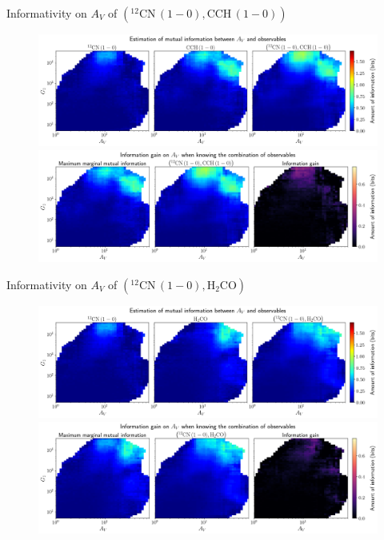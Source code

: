 \documentclass{beamer}
\begin{document}
\begin{frame}{Informativity on $A_V$ of $\left(\mathrm{^{12}CN\,(1-0)},\mathrm{CCH\,(1-0)}\right)$}
    \begin{figure}
        \centering
        \includegraphics[width=0.95\linewidth]{../mi/av__12cn10_cch10_mi.png}
        \vfill
        \includegraphics[width=0.95\linewidth]{../mi/av__12cn10_cch10_mi_gain.png}
    \end{figure}
\end{frame}

\begin{frame}{Informativity on $A_V$ of $\left(\mathrm{^{12}CN\,(1-0)},\mathrm{H_2CO}\right)$}
    \begin{figure}
        \centering
        \includegraphics[width=0.95\linewidth]{../mi/av__12cn10_h2co_mi.png}
        \vfill
        \includegraphics[width=0.95\linewidth]{../mi/av__12cn10_h2co_mi_gain.png}
    \end{figure}
\end{frame}
\end{document}
